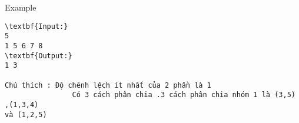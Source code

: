 Example
\begin{verbatim}
\textbf{Input:}
5 
1 5 6 7 8
\textbf{Output:}
1 3

Chú thích : Độ chênh lệch ít nhất của 2 phần là 1
                Có 3 cách phân chia .3 cách phân chia nhóm 1 là (3,5) ,(1,3,4) 
và (1,2,5)

\end{verbatim}